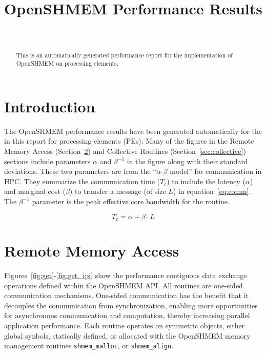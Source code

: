 \documentclass{article}
\begin{document}
\title{OpenSHMEM Performance Results}
\author{
	 \\
	
}

\maketitle

\begin{abstract}
This is an automatically generated performance report for the
 implementation of OpenSHMEM on  processing
elements.
\end{abstract}

\section{Introduction} \label{sec:intro}

The OpenSHMEM performance results have been generated automatically for the
 in this report for  processing elements
(PEs). Many of the figures in the Remote Memory Access (Section~\ref{sec:rma})
and Collective Routines (Section~\ref{sec:collective}) sections include
parameters \(\alpha\) and \(\beta^{-1}\) in the figure along with their
standard deviations. These two parameters are from the ``\(\alpha\)-\(\beta\)
model'' for communication in HPC. They summarize the communication time
(\(T_c\)) to include the latency (\(\alpha\)) and marginal cost (\(\beta\)) to
transfer a message (of size \(L\)) in equation~\ref{eq:comm}. The
\(\beta^{-1}\) parameter is the peak effective core bandwidth for the routine.

\begin{equation}
	T_c = \alpha + \beta \cdot L
	\label{eq:comm}
\end{equation}

\section{Remote Memory Access} \label{sec:rma}
Figures~\ref{fig:get}-\ref{fig:get_ipi} show the performance contiguous data
exchange operations defined within the OpenSHMEM API. All routines are
one-sided communication mechanisms. One-sided communication has the benefit
that it decouples the communication from synchronization, enabling more
opportunities for asynchronous communication and computation, thereby
increasing parallel application performance. Each routine operates on symmetric
objects, either global synbols, statically defined, or allocated with the
OpenSHMEM memory management routines \texttt{shmem\_malloc}, or
\texttt{shmem\_align}.
\end{document}
